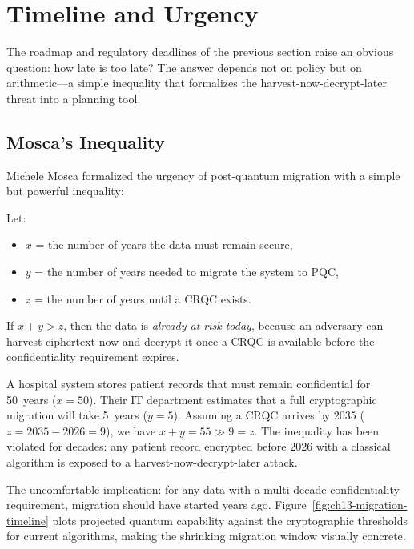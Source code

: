 \section{Timeline and Urgency}
\label{sec:timeline}

The roadmap and regulatory deadlines of the previous section raise an obvious question: how late is too late?  The answer depends not on policy but on arithmetic---a simple inequality that formalizes the harvest-now-decrypt-later threat into a planning tool.

\subsection{Mosca's Inequality}
\label{subsec:mosca}

Michele Mosca formalized the urgency of post-quantum migration with a simple but powerful inequality:

\begin{definition}
\label{def:mosca}
Let:
\begin{itemize}
\item $x$ = the number of years the data must remain secure,
\item $y$ = the number of years needed to migrate the system to PQC,
\item $z$ = the number of years until a CRQC exists.
\end{itemize}
If $x + y > z$, then the data is \emph{already at risk today}, because an adversary can harvest ciphertext now and decrypt it once a CRQC is available before the confidentiality requirement expires.
\end{definition}

\begin{example}
\label{ex:mosca-hospital}
A hospital system stores patient records that must remain confidential for 50~years ($x = 50$).  Their IT department estimates that a full cryptographic migration will take 5~years ($y = 5$).  Assuming a CRQC arrives by 2035 ($z = 2035 - 2026 = 9$), we have $x + y = 55 \gg 9 = z$.  The inequality has been violated for decades: any patient record encrypted before 2026 with a classical algorithm is exposed to a harvest-now-decrypt-later attack.
\end{example}

The uncomfortable implication: for any data with a multi-decade confidentiality requirement, migration should have started years ago.  Figure~\ref{fig:ch13-migration-timeline} plots projected quantum capability against the cryptographic thresholds for current algorithms, making the shrinking migration window visually concrete.

